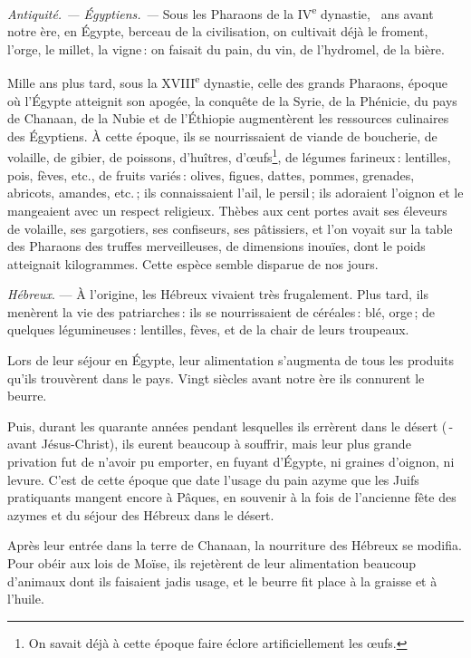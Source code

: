 \sk

\textit{Antiquité. — Égyptiens. —} Sous les Pharaons de la
IV\textsuperscript{e} dynastie, {\mmm} {\mmm} ans avant notre ère,
en Égypte, berceau de la civilisation, on cultivait déjà le froment, l'orge, le
millet, la vigne : on faisait du pain, du vin, de l'hydromel, de la bière.

Mille ans plus tard, sous la XVIII\textsuperscript{e} dynastie, celle des
grands Pharaons, époque où l'Égypte atteignit son apogée, la conquête de la
Syrie, de la Phénicie, du pays de Chanaan, de la Nubie et de l'Éthiopie
augmentèrent les ressources culinaires des Égyptiens. À cette époque, ils se
nourrissaient de viande de boucherie, de volaille, de gibier, de poissons,
d'huîtres, d'œufs\footnote{On savait déjà à cette époque faire éclore
artificiellement les œufs.}, de légumes farineux : lentilles, pois, fèves,
etc., de fruits variés : olives, figues, dattes, pommes, grenades, abricots,
amandes, etc. ; ils connaissaient l'ail, le persil ; ils adoraient l'oignon et
le mangeaient avec un respect religieux. Thèbes aux cent portes avait ses
éleveurs de volaille, ses gargotiers, ses confiseurs, ses pâtissiers, et l'on
voyait sur la table des Pharaons des truffes merveilleuses, de dimensions
inouïes, dont le poids atteignait {\mmm} kilogrammes. Cette espèce semble
disparue de nos jours.

\sk

\textit{Hébreux}. — À l'origine, les Hébreux vivaient très frugalement. Plus
tard, ils menèrent la vie des patriarches : ils se nourrissaient de céréales :
blé, orge ; de quelques légumineuses : lentilles, fèves, et de la chair de
leurs troupeaux.

Lors de leur séjour en Égypte, leur alimentation s'augmenta de tous les
produits qu'ils trouvèrent dans le pays. Vingt siècles avant notre ère ils
connurent le beurre.

Puis, durant les quarante années pendant lesquelles ils errèrent dans le désert
({\mmm} {\mmm}-{\mmm} {\mmm} avant Jésus-Christ), ils eurent
beaucoup à souffrir, mais leur plus grande privation fut de n'avoir pu
emporter, en fuyant d'Égypte, ni graines d'oignon, ni levure. C'est de cette
époque que date l'usage du pain azyme que les Juifs pratiquants mangent encore
à Pâques, en souvenir à la fois de l'ancienne fête des azymes et du séjour des
Hébreux dans le désert.

Après leur entrée dans la terre de Chanaan, la nourriture des Hébreux se
modifia. Pour obéir aux lois de Moïse, ils rejetèrent de leur alimentation
beaucoup d'animaux dont ils faisaient jadis usage, et le beurre fit place à la
graisse et à l'huile.

